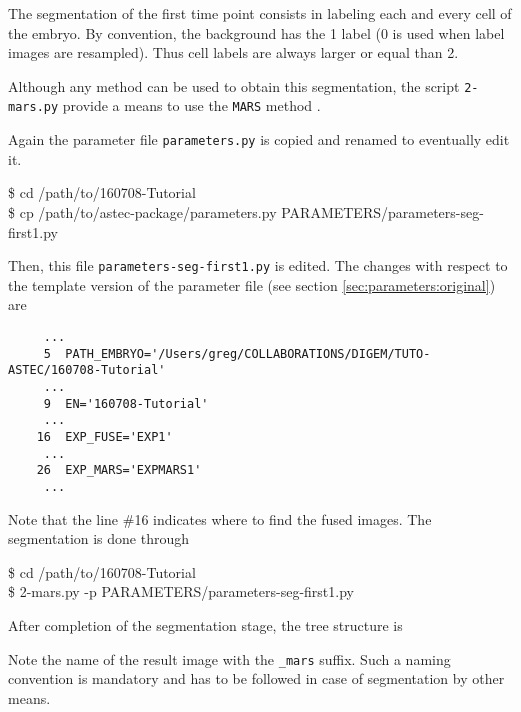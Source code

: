The segmentation of the first time point consists in labeling each and every cell of the embryo. By convention, the background has the 1 label (0 is used when label images are resampled). Thus cell labels are always larger or equal than 2.

Although any method can be used to obtain this segmentation, the script \texttt{2-mars.py} provide a means to use the \texttt{MARS} method \cite{fernandez:hal-00521491}.

Again the parameter file \texttt{parameters.py} is copied  and renamed to eventually edit it. 


\begin{code}{0.8}
\$ cd /path/to/160708-Tutorial\\
\$ cp /path/to/astec-package/parameters.py  PARAMETERS/parameters-seg-first1.py
\end{code}



Then, this file \texttt{parameters-seg-first1.py} is edited. The changes with respect to the template version of the parameter file (see section \ref{sec:parameters:original}) are

\begin{verbatim}
     ...
     5	PATH_EMBRYO='/Users/greg/COLLABORATIONS/DIGEM/TUTO-ASTEC/160708-Tutorial'	
     ...
     9	EN='160708-Tutorial'			
     ... 
    16	EXP_FUSE='EXP1'	
     ...
    26	EXP_MARS='EXPMARS1'		
     ...
\end{verbatim}

Note that the line \#16 indicates where to find the fused images.
The segmentation is done through

\begin{code}{0.8}
\$ cd /path/to/160708-Tutorial\\
\$ 2-mars.py -p PARAMETERS/parameters-seg-first1.py 
\end{code}


After completion of the segmentation stage, the tree structure is 

Note the name of the result image with the \texttt{\_mars} suffix. Such a naming convention is mandatory and has to be followed in case of segmentation by other means.











